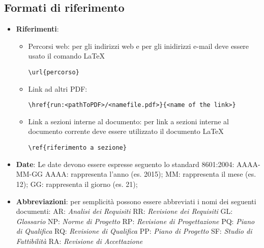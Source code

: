 \documentclass{scalatekids-article}
\begin{document}
\subsection{Formati di riferimento}
\begin{itemize}
\item \textbf{Riferimenti}:
  \begin{itemize}
  \item Percorsi web: per gli indirizzi web e per gli inidirizzi e-mail deve essere usato il comando \LaTeX\xspace
    \begin{center}
      \verb=\url{percorso}=
    \end{center}
  \item Link ad altri PDF:
    \begin{center}
      \verb=\href{run:<pathToPDF>/<namefile.pdf>}{<name of the link>}=
    \end{center}
  \item Link a sezioni interne al documento: per link a sezioni interne al documento corrente deve essere utilizzato il documento \LaTeX\xspace
    \begin{center}
      \verb=\ref{riferimento a sezione}=
    \end{center}
  \end{itemize}
\item \textbf{Date}: Le date devono essere espresse seguento lo standard \textit{} 8601:2004:
  AAAA-MM-GG
  AAAA: rappresenta l'anno (es. 2015);
  MM:	rappresenta il mese (es. 12);
  GG: rappresenta il giorno (es. 21);

\item \textbf{Abbreviazioni}: per semplicità possono essere abbreviati i nomi dei seguenti documenti:
  AR: \textit{Analisi dei Requisiti}
  RR: \textit{Revisione dei Requisiti}
  GL: \textit{Glossario}
  NP: \textit{Norme di Progetto}
  RP: \textit{Revisione di Progettazione}
  PQ: \textit{Piano di Qualifica}
  RQ: \textit{Revisione di Qualifica}
  PP: \textit{Piano di Progetto}
  SF: \textit{Studio di Fattibilità}
  RA: \textit{Revisione di Accettazione}


\end{itemize}
\end{document}
